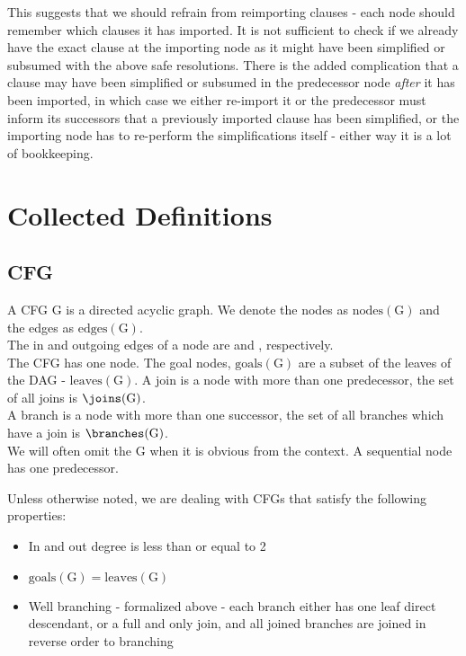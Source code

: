 This suggests that we should refrain from reimporting clauses - each node should remember which clauses it has imported.
It is not sufficient to check if we already have the exact clause at the importing node as it might have been simplified or subsumed with the above safe resolutions.
There is the added complication that a clause may have been simplified or subsumed in the predecessor node \emph{after} it has been imported, in which case we either re-import it or the predecessor must inform its successors that a previously imported clause has been simplified, or the importing node has to re-perform the simplifications itself - either way it is a lot of bookkeeping.

\section{Collected Definitions}
\subsection*{CFG}
A CFG $\mathrm{G}$ is a directed acyclic graph. We denote the nodes as $\mathrm{nodes}(\mathrm{G})$ and the edges as $\mathrm{edges}(\mathrm{G})$.\\
The in and outgoing edges of a node  are  and , respectively.\\
The CFG has one  node.
The goal nodes, $\mathrm{goals}(\mathrm{G})$ are a subset of the leaves of the DAG - $\mathrm{leaves}(\mathrm{G})$.
A join is a node with more than one predecessor, the set of all joins is $\joins(\mathrm{G})$.\\
A branch is a node with more than one successor, the set of all branches which have a join is $\branches(\mathrm{G})$.\\
We will often omit the $\mathrm{G}$ when it is obvious from the context.
A sequential node has one predecessor.

Unless otherwise noted, we are dealing with CFGs that satisfy the following properties:
\begin{itemize}
	\item In and out degree is less than or equal to 2
	\item $\mathrm{goals}(\mathrm{G})=\mathrm{leaves}(\mathrm{G})$
	\item Well branching - formalized above - each branch either has one leaf direct descendant, or a full and only join, and all joined branches are joined in reverse order to branching
\end{itemize}

